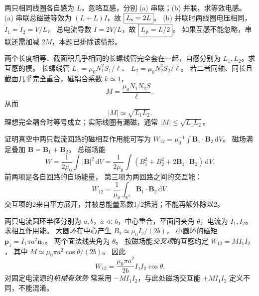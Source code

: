 两只相同线圈各自感为 $L$，忽略互感，分别 (a) 串联；(b) 并联，求等效电感。
\exsolution
(a) 串联总磁链等效为
$(L+L)I$，故
$\boxed{L_{\rm s}=2L}$。
(b) 并联时两线圈电压相同，
$\dot I_1=\dot I_2=V/L$，
总电流导数 $\dot I=2V/L$，故
$\boxed{L_{\rm p}=L/2}$。
\excheck 如果互感不能忽略，串联还需加减 $2M$，本题已排除该情形。

两个长度相等、截面积几乎相同的长螺线管完全套在一起，自感分别为 $L_1,L_2$。求互感的模。
\exsolution
长螺线管
$L_1=\mu_0N_1^2S_1/\ell$、
$L_2=\mu_0N_2^2S_2/\ell$。
若二者同轴、同长且截面几乎完全重合，磁耦合系数 $k\simeq1$，
\[
M=\frac{\mu_0N_1N_2S}{\ell},
\]
从而
\[
\boxed{|M|\simeq\sqrt{L_1L_2}}.
\]
\excheck 理想完全耦合时等号成立；实际线圈有漏磁，通常 $|M|\le\sqrt{L_1L_2}$。

证明真空中两只载流回路的磁相互作用能可写为
$W_{12}=\mu_0^{-1}\int\bm B_1\cdot\bm B_2\,\mathrm dV$。
\exsolution
磁场满足叠加 $\bm B=\bm B_1+\bm B_2$。
总磁场能
\[
W=\frac1{2\mu_0}\int|\bm B|^2\,\mathrm dV
=\frac1{2\mu_0}\int(B_1^2+B_2^2+
2\bm B_1\cdot\bm B_2)\,\mathrm dV.
\]
前两项是各自回路的自场能量，
第三项为两回路之间的交互能：
\[
\boxed{W_{12}=\frac1{\mu_0}
\int_{\mathbb R^3}\bm B_1\cdot\bm B_2\,\mathrm dV}.
\]
\excheck 交互项的2来自平方展开，并被总能量系数1/2抵消；不能再额外除以2。

两只电流圆环半径分别为 $a,b$，$a\ll b$，中心重合，平面间夹角 $\theta$，电流为 $I_1,I_2$。求相互作用能。
\exsolution
大圆环在中心产生
$B_2\simeq\mu_0I_2/(2b)$，
小圆环的磁矩
$\bm p_1=I_1\pi a^2\bm n_1$。
两个面法线夹角为 $\theta$。
按磁场能\emph{交叉项}的互感约定
$W_{12}=MI_1I_2$，
其中
$M\simeq\mu_0\pi a^2\cos\theta/(2b)$。
因此
\[
\boxed{W_{12}=\frac{\mu_0\pi a^2}{2b}
I_1I_2\cos\theta}.
\]
\excheck 对固定电流源的\emph{机械有效势}
常采用 $-MI_1I_2$，与此处磁场交互能 $+MI_1I_2$ 定义不同，不能混淆。
